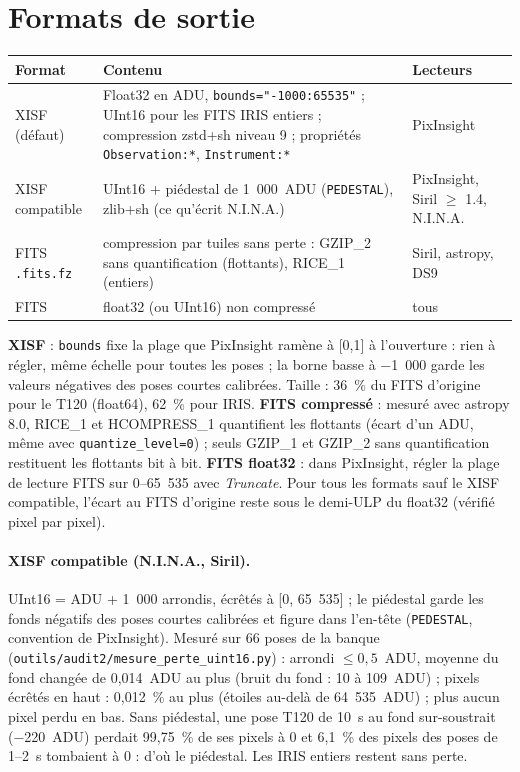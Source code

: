 \section{Formats de sortie}
\begin{center}\small
\begin{tabularx}{\linewidth}{@{}lXl@{}}
\toprule
\textbf{Format} & \textbf{Contenu} & \textbf{Lecteurs}\\
\midrule
XISF (défaut) & Float32 en ADU, \texttt{bounds="-1000:65535"} ; UInt16 pour les FITS IRIS entiers ; compression zstd+sh niveau 9 ; propriétés \texttt{Observation:*}, \texttt{Instrument:*} & PixInsight\\
XISF compatible & UInt16 + piédestal de 1~000~ADU (\texttt{PEDESTAL}), zlib+sh (ce qu'écrit N.I.N.A.) & PixInsight, Siril $\geq$ 1.4, N.I.N.A.\\
FITS \texttt{.fits.fz} & compression par tuiles sans perte : GZIP\_2 sans quantification (flottants), RICE\_1 (entiers) & Siril, astropy, DS9\\
FITS & float32 (ou UInt16) non compressé & tous\\
\bottomrule
\end{tabularx}
\end{center}
\textbf{XISF} : \texttt{bounds} fixe la plage que PixInsight ramène à [0,1] à l'ouverture : rien à régler, même
échelle pour toutes les poses ; la borne basse à −1~000 garde les valeurs négatives des poses courtes calibrées.
Taille : 36~\% du FITS d'origine pour le T120 (float64), 62~\% pour IRIS. \textbf{FITS compressé} : mesuré avec
astropy 8.0, RICE\_1 et HCOMPRESS\_1 quantifient les flottants (écart d'un ADU, même avec
\texttt{quantize\_level=0}) ; seuls GZIP\_1 et GZIP\_2 sans quantification restituent les flottants bit à bit.
\textbf{FITS float32} : dans PixInsight, régler la plage de lecture FITS sur 0–65~535 avec \emph{Truncate}.
Pour tous les formats sauf le XISF compatible, l'écart au FITS d'origine reste sous le demi-ULP du float32
(vérifié pixel par pixel).

\paragraph{XISF compatible (N.I.N.A., Siril).} UInt16 = ADU + 1~000 arrondis, écrêtés à [0, 65~535] ; le piédestal
garde les fonds négatifs des poses courtes calibrées et figure dans l'en-tête (\texttt{PEDESTAL}, convention de
PixInsight). Mesuré sur 66 poses de la banque (\texttt{outils/audit2/mesure\_perte\_uint16.py}) : arrondi
$\le 0{,}5$~ADU, moyenne du fond changée de 0,014~ADU au plus (bruit du fond : 10 à 109~ADU) ; pixels écrêtés en
haut : 0,012~\% au plus (étoiles au-delà de 64~535~ADU) ; plus aucun pixel perdu en bas. Sans piédestal, une pose
T120 de 10~s au fond sur-soustrait (−220~ADU) perdait 99,75~\% de ses pixels à 0 et 6,1~\% des pixels des poses de
1–2~s tombaient à 0 : d'où le piédestal. Les IRIS entiers restent sans perte.

